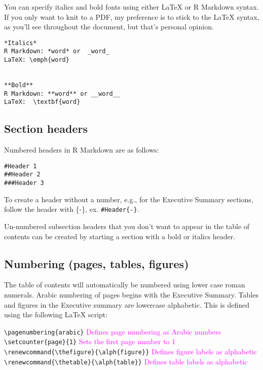 \documentclass[12pt,]{article}
\begin{document}
You can specify italics and bold fonts using either LaTeX or R Markdown
syntax. If you only want to knit to a PDF, my preference is to stick to
the LaTeX syntax, as you'll see throughout the document, but that's
personal opinion.

\begin{Verbatim}[frame=single]
*Italics*  
R Markdown: *word* or  _word_  
LaTeX: \emph{word}


**Bold**     
R Markdown: **word** or __word__ 
LaTeX:  \textbf{word} 

\end{Verbatim}

\subsection{Section headers}\label{section-headers}

Numbered headers in R Markdown are as follows:

\begin{Verbatim}[frame=single]
#Header 1  
##Header 2 
###Header 3
\end{Verbatim}

To create a header without a number, e.g., for the Executive Summary
sections, follow the header with \{-\}, ex. \texttt{\#Header\{-\}}.

Un-numbered subsection headers that you don't want to appear in the
table of contents can be created by starting a section with a bold or
italics header.

\subsection{Numbering (pages, tables,
figures)}\label{numbering-pages-tables-figures}

The table of contents will automatically be numbered using lower case
roman numerals. Arabic numbering of pages begins with the Executive
Summary. Tables and figures in the Executive summary are lowercase
alphabetic. This is defined using the following LaTeX script:

\texttt{\textbackslash{}pagenumbering\{arabic\}}
\textcolor{magenta}{Defines page numbering as Arabic numbers}\\
\texttt{\textbackslash{}setcounter\{page\}\{1\}}
\textcolor{magenta}{Sets the first page number to 1}\\
\texttt{\textbackslash{}renewcommand\{\textbackslash{}thefigure\}\{\textbackslash{}alph\{figure\}\}}
\textcolor{magenta}{Defines figure labels as alphabetic}\\
\texttt{\textbackslash{}renewcommand\{\textbackslash{}thetable\}\{\textbackslash{}alph\{table\}\}}
\textcolor{magenta}{Defines table labels as alphabetic}
\end{document}
